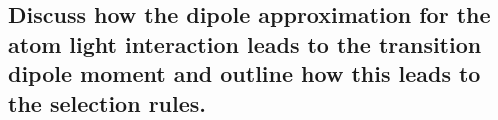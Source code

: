 \subsection{Discuss how the dipole approximation for the atom light interaction leads to the transition dipole moment and outline how this leads to the selection rules.}


